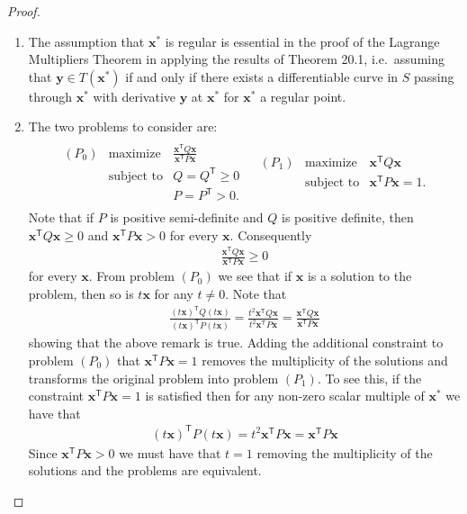 \documentclass[12pt]{article}
\theoremstyle{definition}
\newcommand{\vc}[1]{\boldsymbol{#1}}
\newcommand{\tran}{\mathsf{T}}
\begin{document}
\begin{proof}
  \begin{enumerate}
    \item The assumption that $\vc{x}^*$ is regular is essential in  the proof of the Lagrange Multipliers Theorem
      in applying the results of Theorem 20.1, i.e.\ assuming that $\vc{y}\in T(\vc{x}^*)$ if and only if
      there exists a differentiable curve in $S$ passing through $\vc{x}^*$
      with derivative $\vc{y}$ at $\vc{x}^*$ for $\vc{x}^*$ a regular point.
    \item The two problems to consider are:
      \begin{align*}
        \begin{array}{ll}
          \begin{array}{rrl}
            (P_0) & \text{maximize} & \frac{\vc{x}^\tran Q \vc{x}}{\vc{x}^\tran P \vc{x}}\\
            & \text{subject to} & Q = Q^\tran \geq 0 \\
            & & P = P^\tran > 0.
          \end{array}
          &
          \begin{array}{rrl}
            (P_1) & \text{maximize} & \vc{x}^\tran Q \vc{x}\\
            & \text{subject to} & \vc{x}^\tran P \vc{x} = 1.
          \end{array}
        \end{array}
      \end{align*}
      Note that if $P$ is positive semi-definite and $Q$ is positive definite, then
      $\vc{x}^\tran Q \vc{x} \geq 0$ and $\vc{x}^\tran P \vc{x} > 0$ for every $\vc{x}$. Consequently
      \begin{align*}
        \frac{\vc{x}^\tran Q \vc{x}}{\vc{x}^\tran P \vc{x}} \geq 0
      \end{align*}
      for every $\vc{x}$. From problem $(P_0)$ we see that if $\vc{x}$ is a solution to the problem,
      then so is $t\vc{x}$ for any $t \neq 0$. Note that
      \begin{align*}
        \frac{(t\vc{x})^\tran Q (t\vc{x})}{(t\vc{x})^\tran P (t\vc{x})} = \frac{t^2 \vc{x}^\tran Q \vc{x}}{t^2 \vc{x}^\tran P \vc{x}} = \frac{\vc{x}^\tran Q \vc{x}}{\vc{x}^\tran P \vc{x}}
      \end{align*}
      showing that the above remark is true. Adding the additional constraint to problem $(P_0)$ that $\vc{x}^\tran P \vc{x} = 1$ removes the multiplicity of the solutions and transforms
      the original problem into problem $(P_1)$. To see this, if the constraint $\vc{x}^\tran P \vc{x} = 1$
      is satisfied then for any non-zero scalar multiple of $\vc{x}^*$ we have that
      \begin{align*}
        (t\vc{x})^\tran P (t\vc{x}) = t^2 \vc{x}^\tran P\vc{x} = \vc{x}^\tran P\vc{x}
      \end{align*}
      Since $\vc{x}^\tran P\vc{x} > 0$ we must have that $t=1$ removing the multiplicity of the solutions
      and the problems are equivalent.


\end{enumerate}
\end{proof}
\end{document}
